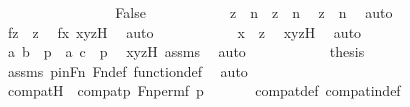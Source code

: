 \begin{isabellebody}
\ \ \ \ \ \ \isamarkupfalse%
\isanewline
\ \ \ \ \ \ \ \ \isamarkupfalse%
\ False\isanewline
\ \ \ \ \ \ \ \ \isamarkupfalse%
\ \isamarkupfalse%
\ {\isachardoublequoteopen}z\ {\isasymnoteq}\ n\ {\isasymand}\ z\ {\isasymnoteq}\ n{\isacharprime}{\kern0pt}{\isachardoublequoteclose}\ \isamarkupfalse%
\ {\isacartoucheopen}z\ {\isasymnoteq}\ n{\isacartoucheclose}\ \isamarkupfalse%
\ auto\isanewline
\ \ \ \ \ \ \ \ \isamarkupfalse%
\ \isamarkupfalse%
\ {\isachardoublequoteopen}f{\isacharbackquote}{\kern0pt}z\ {\isacharequal}{\kern0pt}\ z{\isachardoublequoteclose}\ \isamarkupfalse%
\ fx\ xyzH\ \isamarkupfalse%
\ auto\isanewline
\ \ \ \ \ \ \ \ \isamarkupfalse%
\ \isamarkupfalse%
\ {\isachardoublequoteopen}x\ {\isacharequal}{\kern0pt}\ z{\isachardoublequoteclose}\ \isamarkupfalse%
\ xyzH\ \isamarkupfalse%
\ auto\isanewline
\ \ \ \ \ \ \ \ \isamarkupfalse%
\ \isamarkupfalse%
\ {\isachardoublequoteopen}{\isacharless}{\kern0pt}a{\isacharcomma}{\kern0pt}\ b{\isachargreater}{\kern0pt}\ {\isasymin}\ p\ {\isasymand}\ {\isacharless}{\kern0pt}a{\isacharcomma}{\kern0pt}\ c{\isachargreater}{\kern0pt}\ {\isasymin}\ p{\isachardoublequoteclose}\ \isamarkupfalse%
\ xyzH\ assms{}\ \isamarkupfalse%
\ auto\isanewline
\ \ \ \ \ \ \ \ \isamarkupfalse%
\ \isamarkupfalse%
\ {\isacharquery}{\kern0pt}thesis\ \isamarkupfalse%
\ assms{}\ pinFn\ Fn{\isacharunderscore}{\kern0pt}def\ function{\isacharunderscore}{\kern0pt}def\ \isamarkupfalse%
\ auto\isanewline
\ \ \ \ \ \ \isamarkupfalse%
\isanewline
\ \ \ \ \isamarkupfalse%
\isanewline
\ \ \isamarkupfalse%
\isanewline
\ \ \isamarkupfalse%
\ \isamarkupfalse%
\ compatH\ {\isacharcolon}{\kern0pt}\ {\isachardoublequoteopen}compat{\isacharparenleft}{\kern0pt}p{\isacharcomma}{\kern0pt}\ Fn{\isacharunderscore}{\kern0pt}perm{\isacharparenleft}{\kern0pt}f{\isacharcomma}{\kern0pt}\ p{\isacharparenright}{\kern0pt}{\isacharparenright}{\kern0pt}{\isachardoublequoteclose}\ \isanewline
\ \ \ \ \isamarkupfalse%
\ compat{\isacharunderscore}{\kern0pt}def\ compat{\isacharunderscore}{\kern0pt}in{\isacharunderscore}{\kern0pt}def\ \isanewline
\ \ \ \ \isamarkupfalse%

\end{isabellebody}
